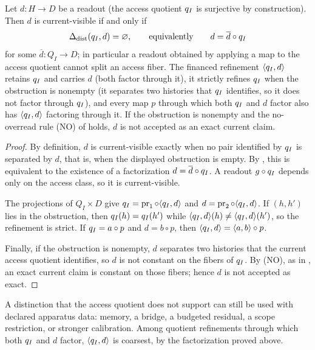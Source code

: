 \begin{theorem}\label{thm:F12}
Let \(d:H\to D\) be a readout (the access quotient \(q_I\) is surjective by construction). Then
\(d\) is current-visible if and only if
\[
  \Delta_{\mathrm{dist}}(q_I,d)=\varnothing,
  \qquad\text{equivalently}\qquad
  d=\overline d\circ q_I
\]
for some \(\overline d:Q_I\to D\); in particular a readout obtained by
applying a map to the access quotient cannot split an access fiber. The
financed refinement \(\langle q_I,d\rangle\) retains \(q_I\) and
carries \(d\) (both factor through it), it strictly refines \(q_I\) when
the obstruction is nonempty (it separates two histories that \(q_I\)
identifies, so it does not factor through \(q_I\)), and every map \(p\) through which both
\(q_I\) and \(d\) factor also has \(\langle q_I,d\rangle\) factoring
through it. If the obstruction is nonempty and the no-overread rule (NO) of
 holds, \(d\) is not accepted as an exact current claim.
\end{theorem}
\begin{proof}
By definition, \(d\) is current-visible exactly when no pair identified by
\(q_I\) is separated by \(d\), that is, when the displayed obstruction is
empty. By , this is equivalent to the existence of a
factorization \(d=\overline d\circ q_I\). A readout \(g\circ q_I\)
depends only on the access class, so it is current-visible.

The projections of \(Q_I\times D\) give
\(q_I=\operatorname{pr}_1\circ\langle q_I,d\rangle\) and
\(d=\operatorname{pr}_2\circ\langle q_I,d\rangle\). If
\((h,h')\) lies in the obstruction, then \(q_I(h)=q_I(h')\) while
\(\langle q_I,d\rangle(h)\ne\langle q_I,d\rangle(h')\), so the
refinement is strict. If \(q_I=a\circ p\) and \(d=b\circ p\), then
\(\langle q_I,d\rangle=\langle a,b\rangle\circ p\).

Finally, if the obstruction is nonempty, \(d\) separates two histories that
the current access quotient identifies, so \(d\) is not constant on the fibers
of \(q_I\). By (NO), as in , an exact current claim is
constant on those fibers; hence \(d\) is not accepted as exact.
\end{proof}

A distinction that the access quotient does not support can still be used
with declared apparatus data: memory, a bridge, a budgeted residual, a
scope restriction, or stronger calibration. Among quotient refinements
through which both \(q_I\) and \(d\) factor,
\(\langle q_I,d\rangle\) is coarsest, by the factorization proved above.

